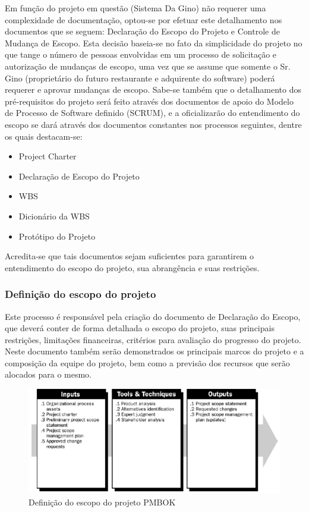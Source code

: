 Em função do projeto em questão (Sistema Da Gino) não requerer uma complexidade de documentação, optou-se por efetuar este detalhamento nos documentos que se seguem: Declaração do Escopo do Projeto e Controle de Mudança de Escopo. Esta decisão baseia-se no fato da simplicidade do projeto no que tange o número de pessoas envolvidas em um processo de solicitação e autorização de mudanças de escopo, uma vez que se assume que somente o Sr. Gino (proprietário do futuro restaurante e adquirente do software) poderá requerer e aprovar mudanças de escopo. Sabe-se também que o detalhamento dos pré-requisitos do projeto será feito através dos documentos de apoio do Modelo de Processo de Software definido (SCRUM), e a oficializarão do entendimento do escopo se dará através dos documentos constantes nos processos seguintes, dentre os quais destacam-se:

\begin{itemize}
\item Project Charter
\item Declaração de Escopo do Projeto
\item WBS
\item Dicionário da WBS
\item Protótipo do Projeto
\end{itemize}

Acredita-se que tais documentos sejam suficientes para garantirem o entendimento do escopo do projeto, sua abrangência e suas restrições.

\subsubsection{Definição do escopo do projeto}

Este processo é responsável pela criação do documento de Declaração do Escopo, que deverá conter de forma detalhada o escopo do projeto, suas principais restrições, limitações financeiras, critérios para avaliação do progresso do projeto. Neste documento também serão demonstrados os principais marcos do projeto e a composição da equipe do projeto, bem como a previsão dos recursos que serão alocados para o mesmo.

\begin{figure}[H]
  \centering
  \includegraphics[width=1\textwidth]{softwareengineer/images/pmbok-scope-definition} 
  \caption{Definição do escopo do projeto PMBOK}
  \label{fig:pmbok-scope-definition} 
\end{figure}

